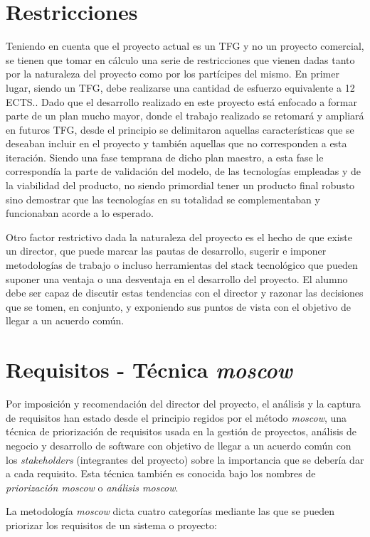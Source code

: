 \section{Restricciones} \label{phytoscheme.restricciones}
\par
Teniendo en cuenta que el proyecto actual es un TFG y no un proyecto comercial, se tienen que tomar en cálculo una serie de restricciones que vienen dadas tanto por la naturaleza del proyecto como por los partícipes del mismo. En primer lugar, siendo un TFG, debe realizarse una cantidad de esfuerzo equivalente a 12 ECTS.. Dado que el desarrollo realizado en este proyecto está enfocado a formar parte de un plan mucho mayor, donde el trabajo realizado se retomará y ampliará en futuros TFG, desde el principio se delimitaron aquellas características que se deseaban incluir en el proyecto y también aquellas que no corresponden a esta iteración.  Siendo una fase temprana de dicho plan maestro, a esta fase le correspondía la parte de validación del modelo, de las tecnologías empleadas y de la viabilidad del producto, no siendo primordial tener un producto final robusto sino demostrar que las tecnologías en su totalidad se complementaban y funcionaban acorde a lo esperado. 
\par
Otro factor restrictivo dada la naturaleza del proyecto es el hecho de que existe un director, que puede marcar las pautas de desarrollo, sugerir e imponer metodologías de trabajo o incluso herramientas del stack tecnológico que pueden suponer una ventaja o una desventaja en el desarrollo del proyecto. El alumno debe ser capaz de discutir estas tendencias con el director y razonar las decisiones que se tomen, en conjunto, y exponiendo sus puntos de vista con el objetivo de llegar a un acuerdo común. 

\section{Requisitos - Técnica \textit{\gls{moscow}}} \label{phytoscheme.requisitos}
\par 
Por imposición y recomendación del director del proyecto, el análisis y la captura de requisitos han estado desde el principio  regidos por el método \textit{\gls{moscow}}, una técnica de priorización de requisitos usada en la gestión de proyectos, análisis de negocio y desarrollo de software con objetivo de llegar a un acuerdo común con los \textit{stakeholders} (integrantes del proyecto) sobre la importancia que se debería dar a cada requisito. Esta técnica también es conocida bajo los nombres de \textit{priorización \gls{moscow}} o \textit{análisis \gls{moscow}}.
\par
La metodología \textit{\gls{moscow}} dicta cuatro categorías mediante las que se pueden priorizar los requisitos de un sistema o proyecto: 

